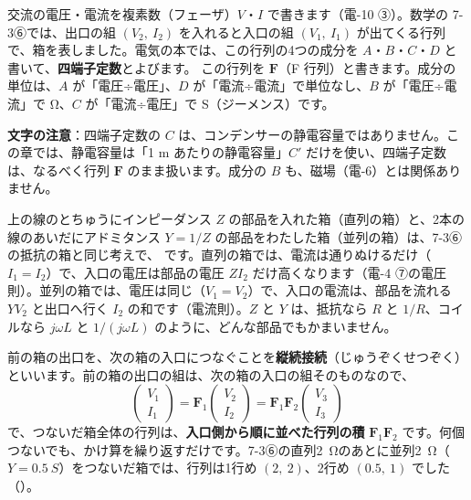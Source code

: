 \noindent 交流の電圧・電流を複素数（フェーザ）$V$・$I$ で書きます（電-10 ③）。数学の 7-3⑥では、出口の組 $(V_2,\ I_2)$ を入れると入口の組 $(V_1,\ I_1)$ が出てくる行列で、箱を表しました。電気の本では、この行列の4つの成分を $A$・$B$・$C$・$D$ と書いて、\textbf{四端子定数}とよびます。
この行列を $\mathbf F$（F 行列）と書きます。成分の単位は、$A$ が「電圧÷電圧」、$D$ が「電流÷電流」で単位なし、$B$ が「電圧÷電流」で Ω、$C$ が「電流÷電圧」で S（ジーメンス）です。

\noindent\textbf{文字の注意}：四端子定数の $C$ は、コンデンサーの静電容量ではありません。この章では、静電容量は「1 m あたりの静電容量」$C'$ だけを使い、四端子定数は、なるべく行列 $\mathbf F$ のまま扱います。成分の $B$ も、磁場（電-6）とは関係ありません。

上の線のとちゅうにインピーダンス $Z$ の部品を入れた箱（直列の箱）と、2本の線のあいだにアドミタンス $Y=1/Z$ の部品をわたした箱（並列の箱）は、7-3⑥の抵抗の箱と同じ考えで、
です。直列の箱では、電流は通りぬけるだけ（$I_1=I_2$）で、入口の電圧は部品の電圧 $ZI_2$ だけ高くなります（電-4 ⑦の電圧則）。並列の箱では、電圧は同じ（$V_1=V_2$）で、入口の電流は、部品を流れる $YV_2$ と出口へ行く $I_2$ の和です（電流則）。$Z$ と $Y$ は、抵抗なら $R$ と $1/R$、コイルなら $j\omega L$ と $1/(j\omega L)$ のように、どんな部品でもかまいません。

前の箱の出口を、次の箱の入口につなぐことを\textbf{縦続接続}（じゅうぞくせつぞく）といいます。前の箱の出口の組は、次の箱の入口の組そのものなので、
\[\begin{pmatrix}V_1\\I_1\end{pmatrix}=\mathbf F_1\begin{pmatrix}V_2\\I_2\end{pmatrix}=\mathbf F_1\mathbf F_2\begin{pmatrix}V_3\\I_3\end{pmatrix}\]
で、つないだ箱全体の行列は、\textbf{入口側から順に並べた行列の積} $\mathbf F_1\mathbf F_2$ です。何個つないでも、かけ算を繰り返すだけです。7-3⑥の直列\qty{2}{\ohm}のあとに並列\qty{2}{\ohm}（$Y=\qty{0.5}{S}$）をつないだ箱では、行列は1行め $(2,\ 2)$、2行め $(0.5,\ 1)$ でした（）。

